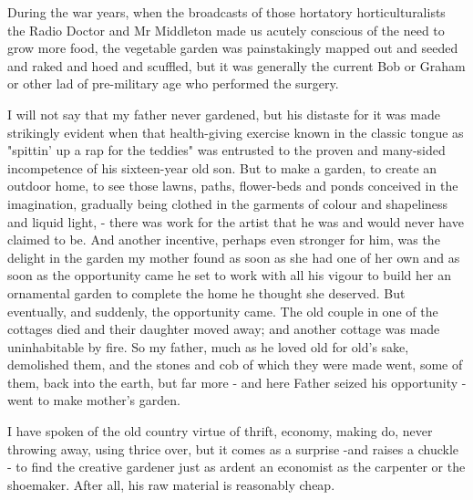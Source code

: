 During the war years, when the broadcasts of those hortatory horticulturalists the Radio Doctor and Mr Middleton made us acutely conscious of the need to grow more food, the vegetable garden was painstakingly mapped out and seeded and raked and hoed and scuffled, but it was generally the current Bob or Graham or other lad of pre-military age who performed the surgery.

I will not say that my father never gardened, but his distaste for it was made strikingly evident when that health-giving exercise known in the classic tongue as "spittin' up a rap for the teddies" was entrusted to the proven and many-sided incompetence of his sixteen-year old son. But to make a garden, to create an outdoor home, to see those lawns, paths, flower-beds and ponds conceived in the imagination, gradually being clothed in the garments of colour and shapeliness and liquid light, - there was work for the artist that he was and would never have claimed to be. And another incentive, perhaps even stronger for him, was the delight in the garden my mother found as soon as she had one of her own and as soon as the opportunity came he set to work with all his vigour to build her an ornamental garden to complete the home he thought she deserved. But eventually, and suddenly, the opportunity came. The old couple in one of the cottages died and their daughter moved away; and another cottage was made uninhabitable by fire. So my father, much as he loved old for old's sake, demolished them, and the stones and cob of which they were made went, some of them, back into the earth, but far more - and here Father seized his opportunity - went to make mother's garden.

I have spoken of the old country virtue of thrift, economy, making do, never throwing away, using thrice over, but it comes as a surprise -and raises a chuckle - to find the creative gardener just as ardent an economist as the carpenter or the shoemaker. After all, his raw material is reasonably cheap.

